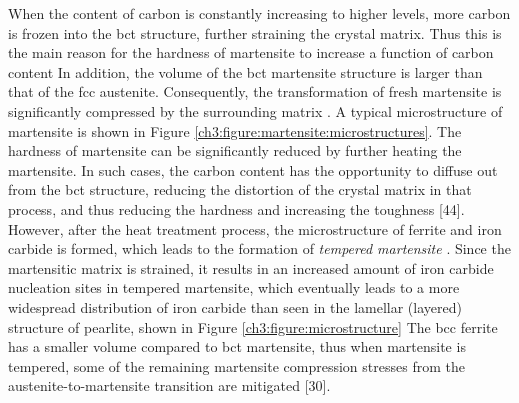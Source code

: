 \documentclass[12pt]{report}
\begin{document}
When the content of carbon is constantly increasing to higher levels, more carbon is frozen into the bct structure, further straining the crystal matrix. Thus this is the main reason for the hardness of martensite to increase a function of carbon content \cite{bajaj2020steels} In addition, the volume of the bct martensite structure is larger than that of the fcc austenite. Consequently, the transformation of fresh martensite is significantly compressed by the surrounding matrix \cite{bajaj2020steels}. A typical microstructure of martensite is shown in Figure \ref{ch3:figure:martensite:microstructures}.
The hardness of martensite can be significantly reduced by further heating the martensite. In such cases, the carbon content has the opportunity to diffuse out from the bct structure, reducing the distortion of the crystal matrix in that process, and thus reducing the hardness and increasing the toughness [44]. However, after the heat treatment process, the microstructure of ferrite and iron carbide is formed, which leads to the formation of \emph{tempered martensite} \cite{bajaj2020steels}. Since the martensitic matrix is strained, it results in an increased amount of iron carbide nucleation sites in tempered martensite, which eventually leads to a more widespread distribution of iron carbide than seen in the lamellar (layered) structure of pearlite, shown in Figure \ref{ch3:figure:microstructure} \cite{bajaj2020steels} The bcc ferrite has a smaller volume compared to bct martensite, thus when martensite is tempered, some of the remaining martensite compression stresses from the austenite-to-martensite transition are mitigated [30].
\end{document}
